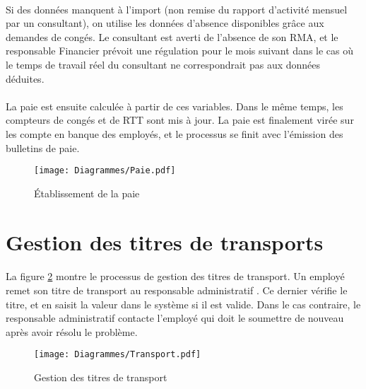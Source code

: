 \paragraph{} Si des données manquent à l'import (non remise du rapport d'activité mensuel par un consultant), on utilise les données d'absence disponibles grâce aux demandes de congés. Le consultant est averti de l'absence de son RMA, et le responsable Financier prévoit une régulation pour le mois suivant dans le cas où le temps de travail réel du consultant ne correspondrait pas aux données déduites.

\paragraph{} La paie est ensuite calculée à partir de ces variables. Dans le même temps, les compteurs de congés et de RTT sont mis à jour. La paie est finalement virée sur les compte en banque des employés, et le processus se finit avec l'émission des bulletins de paie.

\begin{figure}[H]
\centering
\begin{sideways}
	\texttt{[image: Diagrammes/Paie.pdf]}
\end{sideways}
	\caption{Établissement de la paie} 
	\label{paie}
\end{figure}


\section{Gestion des titres de transports}

\paragraph{} La figure \ref{transports} montre le processus de gestion des titres de transport. Un employé remet son titre de transport au responsable administratif . Ce dernier vérifie le titre, et en saisit la valeur dans le système si il est valide. Dans le cas contraire, le responsable administratif contacte l'employé qui doit le soumettre de nouveau après avoir résolu le problème.

\begin{figure}[H]
\centering
	\texttt{[image: Diagrammes/Transport.pdf]}
	\caption{Gestion des titres de transport} 
	\label{transports}
\end{figure}

